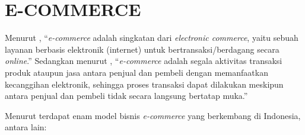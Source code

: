 \section{\uppercase{E-COMMERCE}}
Menurut \citep{yuhefizar2013}, “\textit{e-commerce} adalah singkatan dari \textit{electronic commerce}, yaitu sebuah layanan berbasis elektronik (internet) untuk bertransaksi/berdagang secara \textit{online}.” Sedangkan menurut \citep{saputra2013}, “\textit{e-commerce} adalah segala aktivitas transaksi produk ataupun jasa antara penjual dan pembeli dengan memanfaatkan kecanggihan elektronik, sehingga proses transaksi dapat dilakukan meskipun antara penjual dan pembeli tidak secara langsung bertatap muka.”

\fancyhf{} 
\fancyfoot[R]{\thepage}

Menurut \citep{pradana2015klasifikasi} terdapat enam model bisnis \textit{e-commerce} yang berkembang di Indonesia, antara lain:

